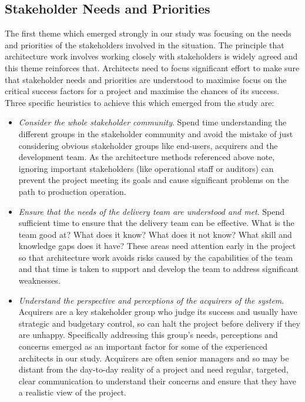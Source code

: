 \subsection{Stakeholder Needs and Priorities}

The first theme which emerged strongly in our study was focusing on the needs and priorities of the stakeholders involved in the situation.  The principle that architecture work involves working closely with stakeholders is widely agreed \cite{rozanski2011-ssa2e, bass2012-sainp} and this theme reinforces that. Architects need to focus significant effort to make sure that stakeholder needs and priorities are understood to maximise focus on the critical success factors for a project and maximise the chances of its success.  Three specific heuristics to achieve this which emerged from the study are:

\begin{itemize}
	\item \emph{Consider the whole stakeholder community}. Spend time understanding the different groups in the stakeholder community and avoid the mistake of just considering obvious stakeholder groups like end-users, acquirers and the development team.  As the architecture methods referenced above note, ignoring important stakeholders (like operational staff or auditors) can prevent the project meeting its goals and cause significant problems on the path to production operation.
	\item \emph{Ensure that the needs of the delivery team are understood and met}.  Spend sufficient time to ensure that the delivery team can be effective.  What is the team good at?  What does it know?  What does it not know?  What skill and knowledge gaps does it have?  These areas need attention early in the project so that architecture work avoids risks caused by the capabilities of the team and that time is taken to support and develop the team to address significant weaknesses.
	\item \emph{Understand the perspective and perceptions of the acquirers of the system}.  Acquirers are a key stakeholder group who judge its success and usually have strategic and budgetary control, so can halt the project before delivery if they are unhappy.  Specifically addressing this group's needs, perceptions and concerns emerged as an important factor for some of the experienced architects in our study.  Acquirers are often senior managers and so may be distant from the day-to-day reality of a project and need regular, targeted, clear communication to understand their concerns and ensure that they have a realistic view of the project. 
\end{itemize}

